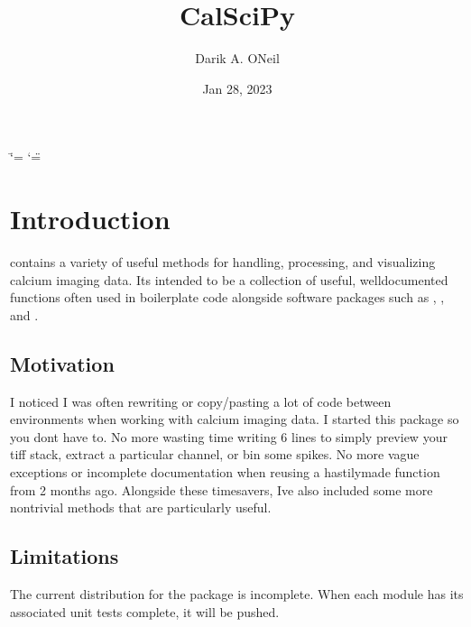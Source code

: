 \documentclass[letterpaper,10pt,english]{sphinxmanual}
\title{CalSciPy}
\date{Jan 28, 2023}
\author{Darik A.\@{} O\textquotesingle{}Neil}
\begin{document}
\ifdefined\shorthandoff
  \ifnum\catcode`\=\string=\active\shorthandoff{=}\fi
  \ifnum\catcode`\"=\active{}\fi
\fi

\pagestyle{empty}
\sphinxmaketitle
\pagestyle{plain}
\sphinxtableofcontents
\pagestyle{normal}
\label{\detokenize{index::doc}}


\sphinxstepscope


\chapter{Introduction}
\label{\detokenize{Introduction:introduction}}\label{\detokenize{Introduction::doc}}
\sphinxAtStartPar
{} contains a variety of useful methods for handling, processing, and visualizing calcium imaging data.
It\textquotesingle{}s intended to be a collection of useful, well\sphinxhyphen{}documented functions often used in boilerplate code alongside software
packages such as , ,
and .


\section{Motivation}
\label{\detokenize{Introduction:motivation}}
\sphinxAtStartPar
I noticed I was often re\sphinxhyphen{}writing or copy/pasting a lot of code between environments when working with calcium imaging
data. I started this package so you don\textquotesingle{}t have to. No more wasting time writing 6 lines to simply preview your tiff
stack, extract a particular channel, or bin some spikes. No more vague exceptions or incomplete documentation when re\sphinxhyphen{}using
a hastily\sphinxhyphen{}made function from 2 months ago. Alongside these time\sphinxhyphen{}savers, I\textquotesingle{}ve also included some more non\sphinxhyphen{}trivial methods
that are particularly useful.


\section{Limitations}
\label{\detokenize{Introduction:limitations}}
\sphinxAtStartPar
The current distribution for the package is incomplete. When each module has its associated unit tests complete, it will
be pushed.

\sphinxstepscope
\end{document}
